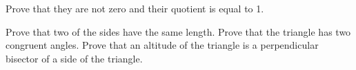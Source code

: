 \begin{list}{\bf{\ref{exer:sec12-7}.}}
\item \begin{list}{\bf{(a)}}
\item Prove that they are not zero and their quotient is equal to 1.
\end{list}
\end{list}
%
%

\begin{list}{}
\item \begin{list}{\bf{(d)}}
\item Prove that two of the sides have the same length.  Prove that the triangle has two congruent angles.  Prove that an altitude of the triangle is a perpendicular bisector of a side of the triangle.
\end{list}
\end{list}




